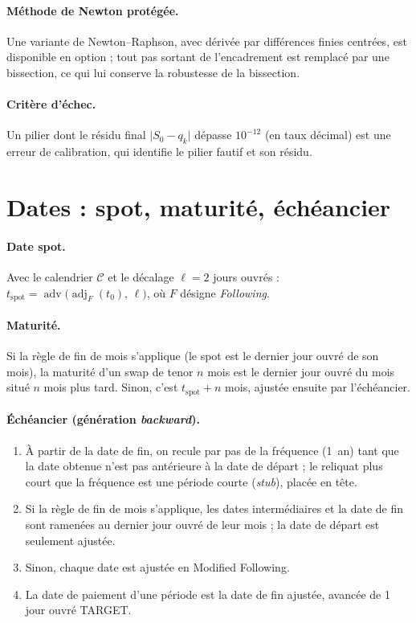 \documentclass[11pt,a4paper]{article}
\DeclareMathOperator{\adj}{adj}
\DeclareMathOperator{\adv}{adv}
\theoremstyle{plain}
\theoremstyle{definition}
\theoremstyle{remark}
\begin{document}
\paragraph{Méthode de Newton protégée.} Une variante de Newton--Raphson, avec dérivée par différences
finies centrées, est disponible en option ; tout pas sortant de l'encadrement est remplacé par une
bissection, ce qui lui conserve la robustesse de la bissection.

\paragraph{Critère d'échec.} Un pilier dont le résidu final $\lvert S_0-q_k\rvert$ dépasse
$10^{-12}$ (en taux décimal) est une erreur de calibration, qui identifie le pilier fautif et son
résidu.

\section{Dates : spot, maturité, échéancier}\label{sec:dates}

\paragraph{Date spot.} Avec le calendrier $\mathcal{C}$ et le décalage $\ell=2$ jours ouvrés :
$t_{\mathrm{spot}}=\adv\bigl(\adj_{F}(t_0),\,\ell\bigr)$, où $F$ désigne \emph{Following}.

\paragraph{Maturité.} Si la règle de fin de mois s'applique (le spot est le dernier jour ouvré de
son mois), la maturité d'un swap de tenor $n$ mois est le dernier jour ouvré du mois situé $n$ mois
plus tard. Sinon, c'est $t_{\mathrm{spot}}+n$ mois, ajustée ensuite par l'échéancier.

\paragraph{Échéancier (génération \emph{backward}).}
\begin{enumerate}
  \item À partir de la date de fin, on recule par pas de la fréquence (1~an) tant que la date obtenue
        n'est pas antérieure à la date de départ ; le reliquat plus court que la fréquence est une période courte
        (\emph{stub}), placée en tête.
  \item Si la règle de fin de mois s'applique, les dates intermédiaires et la date de fin sont ramenées
        au dernier jour ouvré de leur mois ; la date de départ est seulement ajustée.
  \item Sinon, chaque date est ajustée en Modified Following.
  \item La date de paiement d'une période est la date de fin ajustée, avancée de 1 jour ouvré
        TARGET.
\end{enumerate}
\end{document}
